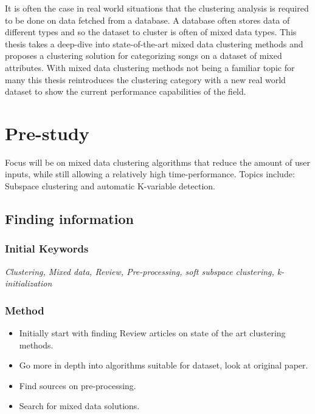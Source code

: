 \documentclass[a4paper,11pt]{article}
\begin{document}
It is often the case in real world situations that the clustering
analysis is required to be done on data fetched from a database. A
database often stores data of different types and so the dataset to
cluster is often of mixed data types. This thesis takes a deep-dive into state-of-the-art mixed data clustering methods and proposes a clustering solution for categorizing songs on a dataset of mixed attributes. With mixed data clustering methods not being a familiar topic for many this thesis reintroduces the clustering category with a new real world dataset to show the current performance capabilities of the field.

\section{Pre-study}


Focus will be on mixed data clustering algorithms that reduce the amount of user inputs, while still allowing a relatively high time-performance. Topics include: Subspace clustering and automatic K-variable detection.

\subsection{Finding information}

\subsubsection{Initial Keywords}

\textit{Clustering, Mixed data, Review, Pre-processing, soft subspace clustering, k-initialization}

\subsubsection{Method}

\begin{itemize}
\item
  Initially start with finding Review articles on state of the art
  clustering methods.
\item
  Go more in depth into algorithms suitable for dataset, look at
  original paper.
\item
  Find sources on pre-processing.
\item
  Search for mixed data solutions.
\end{itemize}
\end{document}
